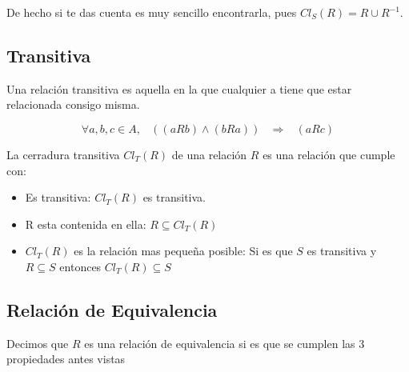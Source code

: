 \documentclass[12pt]{report}                                    %
\DeclareMathOperator \Space {\quad}                             %
\DeclareMathOperator \MiniSpace {\;}                            %
\newcommand \lequal {\MiniSpace \Leftrightarrow \MiniSpace}     %
\newcommand \linfire {\MiniSpace \Rightarrow \MiniSpace}        %
\begin{document}
            De hecho si te das cuenta es muy sencillo encontrarla, pues
            $Cl_S(R) = R \cup R^{-1}$.



        \clearpage
        \subsection{Transitiva}

            Una relación transitiva es aquella en la que cualquier a tiene que estar relacionada consigo
            misma.

            \begin{equation}
                \forall a,b,c \in A, \MiniSpace ((aRb) \land (bRa)) \linfire (aRc)
            \end{equation}

            La cerradura transitiva $Cl_T(R)$ de una relación $R$ es una relación que cumple con:

            \begin{itemize}
                \item Es transitiva: $Cl_T(R)$ es transitiva. 
                \item R esta contenida en ella: $R \subseteq Cl_T(R)$
                \item $Cl_T(R)$ es la relación mas pequeña posible: 
                Si es que $S$ es transitiva y $R \subseteq S$ entonces $Cl_T(R) \subseteq S$
            \end{itemize}


        \clearpage
        \subsection{Relación de Equivalencia}
            Decimos que $R$ es una relación de equivalencia si es que se cumplen las 3 propiedades antes vistas


  





\end{document}
